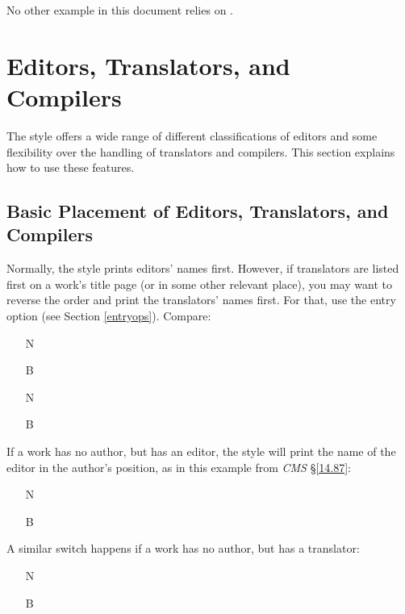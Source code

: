 \documentclass[11pt,letterpaper,oneside]{article}
\begin{document}
\noindent No other example in this document relies on .

\section{Editors, Translators, and Compilers}
\label{edtrans}

The style offers a wide range of different classifications of editors
and some flexibility over the handling of translators and compilers.
This section explains how to use these features.

\subsection{Basic Placement of Editors, Translators, and Compilers}
\label{edtranspos}

Normally, the style prints editors' names first. However, if
translators are listed first on a work's title page (or in some other
relevant place), you may want to reverse the order and print the
translators' names first. For that, use the entry option
 (see Section \ref{entryops}). Compare:

\begin{itemize}
\item[N] 

\item[B] 

\item[N] 

\item[B] 
\end{itemize}

If a work has no author, but has an editor, the style will print the
name of the editor in the author's position, as in this example from
\textit{CMS} \S\ref{14.87}:

\begin{itemize}
\item[N] 

\item[B] 
\end{itemize}

\noindent A similar switch happens if a work has no author, but has a
translator:

\begin{itemize}
\item[N] 

\item[B] 
\end{itemize}
\end{document}
